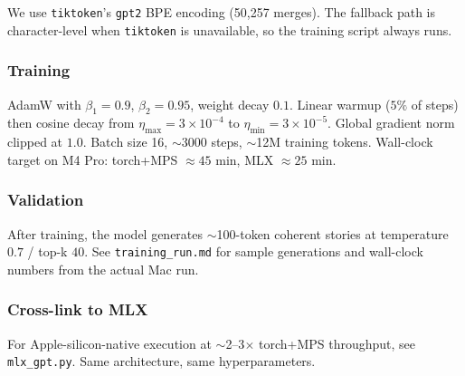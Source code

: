 We use \texttt{tiktoken}'s \texttt{gpt2} BPE encoding (50{,}257 merges). The fallback path is character-level when \texttt{tiktoken} is unavailable, so the training script always runs.

\subsubsection*{Training}

AdamW with $\beta_1=0.9$, $\beta_2=0.95$, weight decay $0.1$. Linear warmup ($5\%$ of steps) then cosine decay from $\eta_{\max}=3\!\times\!10^{-4}$ to $\eta_{\min}=3\!\times\!10^{-5}$. Global gradient norm clipped at $1.0$. Batch size 16, $\sim$3000 steps, $\sim$12M training tokens. Wall-clock target on M4 Pro: torch+MPS $\approx 45$ min, MLX $\approx 25$ min.

\subsubsection*{Validation}

After training, the model generates $\sim$100-token coherent stories at temperature $0.7$ / top-k $40$. See \texttt{training\_run.md} for sample generations and wall-clock numbers from the actual Mac run.

\subsubsection*{Cross-link to MLX}

For Apple-silicon-native execution at $\sim$2--3$\times$ torch+MPS throughput, see \texttt{mlx\_gpt.py}. Same architecture, same hyperparameters.
